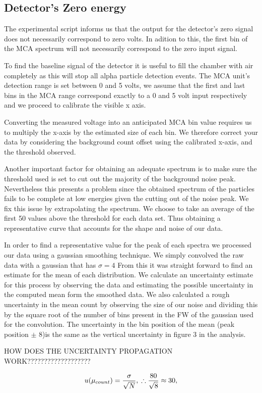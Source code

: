 \documentclass[a4paper]{article}
\begin{document}
\begin{multicols}{2}
\subsection{Detector's Zero energy}
The experimental script informs us that the output for the detector's zero signal does not necessarily correspond to zero volts. In adition to this, the first bin of the MCA spectrum will not necessarily correspond to the zero input signal\cite{SPA}.

To find the baseline signal of the detector it is useful to fill  the  chamber  with  air  completely as this will  stop  all  alpha  particle  detection events\cite{SPA}.
The  MCA  unit’s detection range is set between 0 and 5 volts, we assume that the first and last bins in the MCA range correspond exactly to a 0 and 5 volt input respectively and we proceed to calibrate the visible x axis. 

Converting the measured voltage into an anticipated MCA bin value requires us to multiply the x-axis by the estimated size of each bin.
We therefore correct your data by considering the background count offset using the calibrated x-axis, and the threshold observed.

Another important factor for obtaining an adequate spectrum is to make sure the threshold used is set to cut out the majority of the background noise peak. Nevertheless this presents a problem since the obtained spectrum of the particles fails to be complete at low energies given the cutting out of the noise peak. We fix this issue by extrapolating the spectrum. We choose to take an average of the first 50 values above the threshold for each data set. Thus obtaining a representative curve that accounts for the shape and noise of our data. 

In order to find a representative value for the peak of each spectra we processed our data using a gaussian smoothing technique. We simply convolved the raw data with a gaussian that has $\sigma = 4$ From this it was straight forward to find an estimate for the mean of each distribution.
We calculate an uncertainty estimate for this process by observing the data and estimating the possible uncertainty in the computed mean form the smoothed data. We also calculated a rough uncertainty in the  mean count by observing the size of our noise and dividing this by the square root of the number of bins present in the FW of the gaussian used for the convolution.
The uncertainty in the bin position of the mean (peak position $\pm$ 8)is the same as the vertical uncertainty in figure 3 in the analysis.

HOW DOES THE UNCERTAINTY PROPAGATION WORK???????????????????


\begin{equation} u(\mu_{count}) = \frac{\sigma}{ \sqrt{N}},\\\therefore \frac{80}{ \sqrt{8}} \approx 30,
\end{equation}
\end{multicols}
\end{document}
